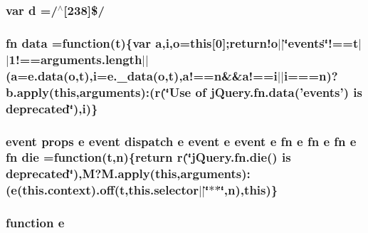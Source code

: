 \hypertarget{jquery-migrate-1_82_81_8min_8js_aeb337d295abaddb5ec3cb34cc2e2bbc9}{
\subsubsection[{d}]{\setlength{\rightskip}{0pt plus 5cm}var d =/$^\wedge$\mbox{[}238\mbox{]}\$/}}\label{jquery-migrate-1_82_81_8min_8js_aeb337d295abaddb5ec3cb34cc2e2bbc9}
\hypertarget{jquery-migrate-1_82_81_8min_8js_a7f60fda3d1d4191e549df075eeacf25b}{
\subsubsection[{data}]{ {\bf fn} data =function({\bf t})\{var {\bf a},{\bf i},{\bf o}=this\mbox{[}0\mbox{]};return!o$\vert$$\vert$\char`\"{}events\char`\"{}!==t$\vert$$\vert$1!==arguments.\-length$\vert$$\vert$({\bf a}=e.\-data({\bf o},{\bf t}),{\bf i}=e.\-\_\-data({\bf o},{\bf t}),a!=={\bf n}\&\&a!=={\bf i}$\vert$$\vert${\bf i}==={\bf n})?b.\-apply(this,arguments)\-:({\bf r}(\char`\"{}Use of j\-Query.\-fn.\-data('events') is deprecated\char`\"{}),i)\}}}\label{jquery-migrate-1_82_81_8min_8js_a7f60fda3d1d4191e549df075eeacf25b}
\hypertarget{jquery-migrate-1_82_81_8min_8js_a8000af92246746444c1d08e9650d86af}{
\subsubsection[{die}]{ event props {\bf e} event dispatch {\bf e} event {\bf e} event {\bf e} {\bf fn} {\bf e} {\bf fn} {\bf e} {\bf fn} {\bf e} {\bf fn} die =function({\bf t},{\bf n})\{return {\bf r}(\char`\"{}j\-Query.\-fn.\-die() is deprecated\char`\"{}),M?M.\-apply(this,arguments)\-:({\bf e}(this.\-context).off({\bf t},this.\-selector$\vert$$\vert$\char`\"{}$\ast$$\ast$\char`\"{},{\bf n}),this)\}}}\label{jquery-migrate-1_82_81_8min_8js_a8000af92246746444c1d08e9650d86af}
\hypertarget{jquery-migrate-1_82_81_8min_8js_a2c038346d47955cbe2cb91e338edd7e1}{
\subsubsection[{e}]{\setlength{\rightskip}{0pt plus 5cm}function e}}\label{jquery-migrate-1_82_81_8min_8js_a2c038346d47955cbe2cb91e338edd7e1}
